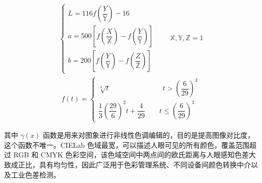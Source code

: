 \documentclass{article}
\begin{document}
\begin{align*}
    \begin{cases}
        L=116f\left(\dfrac{Y}{\mathbb{Y}}\right)-16
        \\[10pt]
        a=500\left[f\left(\dfrac{X}{\mathbb{X}}\right)-f\left(\dfrac{Y}{\mathbb{Y}}\right)\right]
        \\[10pt]
        b=200\left[f\left(\dfrac{Y}{\mathbb{Y}}\right)-f\left(\dfrac{Z}{\mathbb{Z}}\right)\right]
    \end{cases}\qquad \mathbb{X},\mathbb{Y},\mathbb{Z}=1
\end{align*}
\begin{align*}
    f(t)=\begin{cases}
        \displaystyle\sqrt[3]{t}\qquad\qquad\qquad\quad\ \ t>\left(\dfrac{6}{29}\right)^3
        \\
        \displaystyle\dfrac{1}{3}\left(\dfrac{29}{6}\right)^2t+\dfrac{4}{29}\qquad t\leqslant\left(\dfrac{6}{29}\right)^3
    \end{cases}
\end{align*}

其中 $\gamma(x)$ 函数是用来对图象进行非线性色调编辑的，目的是提高图像对比度，这个函数不唯一。CIELab 色域最宽，可以描述人眼可见的所有颜色，覆盖范围超过 RGB 和 CMYK 色彩空间，该色域空间中两点间的欧氏距离与人眼感知色差大致成正比，具有均匀性，因此广泛用于色彩管理系统、不同设备间颜色转换中介以及工业色差检测。
\end{document}
